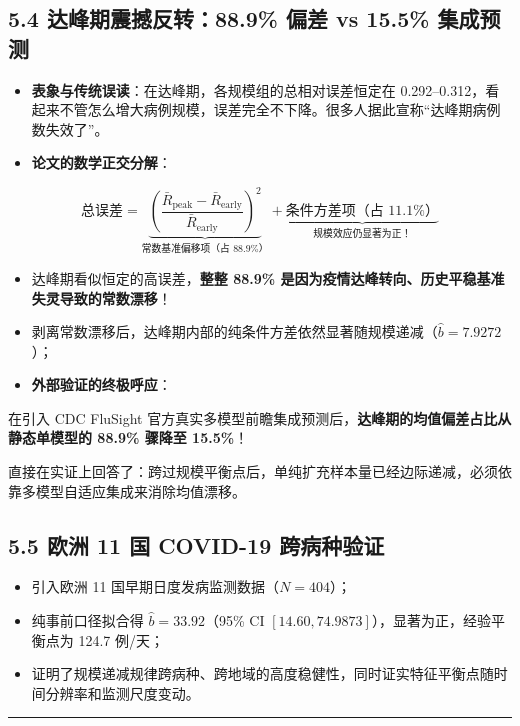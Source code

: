 \documentclass[11pt,a4paper]{ctexart}
\begin{document}
\subsection{5.4 达峰期震撼反转：88.9\% 偏差 vs 15.5\% 集成预测}
\begin{itemize}[leftmargin=2em, itemsep=2pt, parsep=0pt]
\item \textbf{表象与传统误读}：在达峰期，各规模组的总相对误差恒定在 0.292–0.312，看起来不管怎么增大病例规模，误差完全不下降。很多人据此宣称“达峰期病例数失效了”。
\item \textbf{论文的数学正交分解}：
\end{itemize}
\[
\text{总误差} = \underbrace{\left(\frac{\bar{R}_{\mathrm{peak}} - \bar{R}_{\mathrm{early}}}{\bar{R}_{\mathrm{early}}}\right)^2}_{\text{常数基准偏移项（占 88.9\%）}} + \underbrace{\text{条件方差项（占 11.1\%）}}_{\text{规模效应仍显著为正！}}
\]
\begin{itemize}[leftmargin=2em, itemsep=2pt, parsep=0pt]
\item 达峰期看似恒定的高误差，\textbf{整整 88.9\% 是因为疫情达峰转向、历史平稳基准失灵导致的常数漂移}！
\item 剥离常数漂移后，达峰期内部的纯条件方差依然显著随规模递减（$\hat{b} = 7.9272$）；
\item \textbf{外部验证的终极呼应}：
\end{itemize}
在引入 CDC FluSight 官方真实多模型前瞻集成预测后，\textbf{达峰期的均值偏差占比从静态单模型的 88.9\% 骤降至 15.5\%}！

直接在实证上回答了：跨过规模平衡点后，单纯扩充样本量已经边际递减，必须依靠多模型自适应集成来消除均值漂移。


\subsection{5.5 欧洲 11 国 COVID-19 跨病种验证}
\begin{itemize}[leftmargin=2em, itemsep=2pt, parsep=0pt]
\item 引入欧洲 11 国早期日度发病监测数据（$N=404$）；
\item 纯事前口径拟合得 $\hat{b} = 33.92$（95\% CI $[14.60, 74.9873]$），显著为正，经验平衡点为 124.7 例/天；
\item 证明了规模递减规律跨病种、跨地域的高度稳健性，同时证实特征平衡点随时间分辨率和监测尺度变动。
\end{itemize}

\vspace{0.8em}\hrule\vspace{0.8em}
\end{document}
